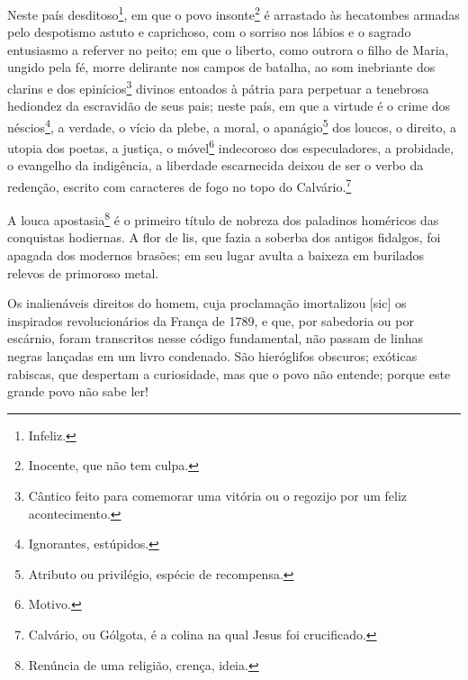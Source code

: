 Neste país desditoso\footnote{Infeliz.}, em que o povo
insonte\footnote{Inocente, que não tem culpa.} é arrastado às
hecatombes armadas pelo despotismo astuto e caprichoso, com o sorriso
nos lábios e o sagrado entusiasmo a referver no peito; em que o liberto,
como outrora o filho de Maria, ungido pela fé, morre delirante nos
campos de batalha, ao som inebriante dos clarins e dos
epinícios\footnote{Cântico feito para comemorar uma vitória ou o
  regozijo por um feliz acontecimento.} divinos entoados à pátria para
perpetuar a tenebrosa hediondez da escravidão de seus pais; neste país,
em que a virtude é o crime dos néscios\footnote{Ignorantes, estúpidos.},
a verdade, o vício da plebe, a moral, o apanágio\footnote{Atributo ou
  privilégio, espécie de recompensa.} dos loucos, o direito, a utopia
dos poetas, a justiça, o móvel\footnote{Motivo.} indecoroso dos
especuladores, a probidade, o evangelho da indigência, a liberdade
escarnecida deixou de ser o verbo da redenção, escrito com caracteres de
fogo no topo do Calvário.\footnote{Calvário, ou Gólgota, é a colina na
  qual Jesus foi crucificado.}

A louca apostasia\footnote{Renúncia de uma religião, crença, ideia.} é
o primeiro título de nobreza dos paladinos homéricos das conquistas
hodiernas. A flor de lis, que fazia a soberba dos antigos fidalgos, foi
apagada dos modernos brasões; em seu lugar avulta a baixeza em burilados
relevos de primoroso metal.

Os inalienáveis direitos do homem, cuja proclamação imortalizou
{[}sic{]} os inspirados revolucionários da França de 1789, e que, por
sabedoria ou por escárnio, foram transcritos nesse código fundamental,
não passam de linhas negras lançadas em um livro condenado. São
hieróglifos obscuros; exóticas rabiscas, que despertam a curiosidade,
mas que o povo não entende; porque este grande povo não sabe ler!


